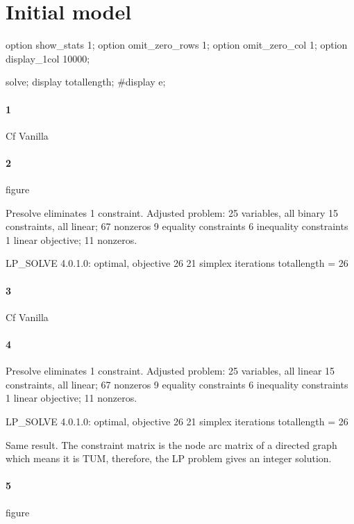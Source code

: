 \documentclass{article}
\begin{document}
\section{Initial model}


option show_stats 1;
option omit_zero_rows 1;
option omit_zero_col 1;
option display_1col 10000;

solve;
display totallength;
#display e;


\paragraph{1}

Cf Vanilla

\paragraph{2}

figure

Presolve eliminates 1 constraint.
Adjusted problem:
25 variables, all binary
15 constraints, all linear; 67 nonzeros
	9 equality constraints
	6 inequality constraints
1 linear objective; 11 nonzeros.

LP_SOLVE 4.0.1.0: optimal, objective 26
21 simplex iterations
totallength = 26

\paragraph{3}

Cf Vanilla

\paragraph{4}


Presolve eliminates 1 constraint.
Adjusted problem:
25 variables, all linear
15 constraints, all linear; 67 nonzeros
	9 equality constraints
	6 inequality constraints
1 linear objective; 11 nonzeros.

LP_SOLVE 4.0.1.0: optimal, objective 26
21 simplex iterations
totallength = 26

Same result. The constraint matrix is the node arc matrix of a directed graph which means it is TUM, therefore, the LP problem gives an integer solution.

\paragraph{5}

figure
\end{document}
